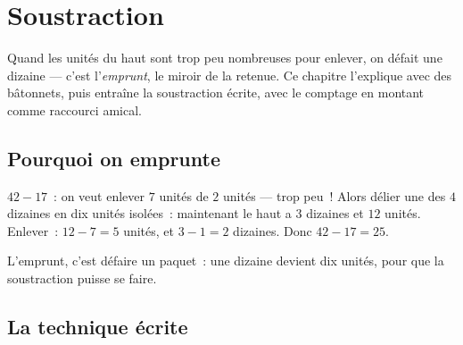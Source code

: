 \chapter{Soustraction}\label{ch:g2:subtraction}

Quand les unités du haut sont trop peu nombreuses pour enlever,
on défait une dizaine --- c'est l'\emph{emprunt}, le miroir de la
retenue. Ce chapitre l'explique avec des bâtonnets, puis
entraîne la soustraction écrite, avec le comptage en montant
comme raccourci amical.

\section{Pourquoi on emprunte}

\begin{example}\label{ex:g2:subtraction:unbundle}
$42 - 17$~: on veut enlever $7$ unités de $2$ unités --- trop
peu~! Alors délier une des $4$ dizaines en dix unités isolées~:
maintenant le haut a $3$ dizaines et $12$ unités. Enlever~:
$12 - 7 = 5$ unités, et $3 - 1 = 2$ dizaines. Donc
$42 - 17 = 25$.
\end{example}

\begin{omfigure}

{\small L'emprunt, c'est défaire un paquet~: une dizaine devient dix
unités, pour que la soustraction puisse se faire.}
\end{omfigure}

\section{La technique écrite}

